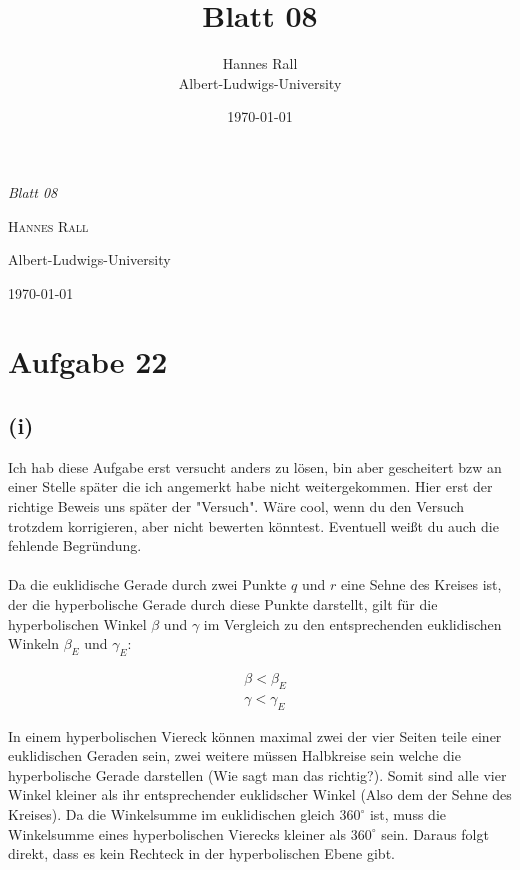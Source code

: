 \documentclass[12pt,a4paper]{article}
\title{Blatt 08}
\author{Hannes Rall \\ Albert-Ludwigs-University}
\date{\today}
\begin{document}
\begin{titlepage}
    \centering
    \vspace*{2cm}
    {\Huge\itshape Blatt 08\par}
    \vspace{2cm}
    {\Large\textsc{Hannes Rall}\par}
    \vfill
    {\large Albert-Ludwigs-University\\}
    \vspace{1cm}
    {\large\today\par}
\end{titlepage}

\newpage
\section*{Aufgabe 22}
\subsection*{(i)}
Ich hab diese Aufgabe erst versucht anders zu lösen, bin aber gescheitert bzw an einer Stelle später die ich angemerkt habe nicht weitergekommen. Hier erst der richtige Beweis uns später der "Versuch". Wäre cool, wenn du den Versuch trotzdem korrigieren, aber nicht bewerten könntest. Eventuell weißt du auch die fehlende Begründung.\\
\\
Da die euklidische Gerade durch zwei Punkte $q$ und $r$ eine Sehne des Kreises ist, der die hyperbolische Gerade durch diese Punkte darstellt, gilt für die hyperbolischen Winkel $\beta$ und $\gamma$ im Vergleich zu den entsprechenden euklidischen Winkeln $\beta_E$ und $\gamma_E$:

\begin{align*}
    & \beta<\beta_E \\ 
    & \gamma < \gamma_E 
\end{align*}

\noindent In einem hyperbolischen Viereck können maximal zwei der vier Seiten teile einer euklidischen Geraden sein, zwei weitere müssen Halbkreise sein welche die hyperbolische Gerade darstellen (Wie sagt man das richtig?). Somit sind alle vier Winkel kleiner als ihr entsprechender euklidscher Winkel (Also dem der Sehne des Kreises). Da die Winkelsumme im euklidischen gleich $360^{\circ}$ ist, muss die Winkelsumme eines hyperbolischen Vierecks kleiner als $360^{\circ}$ sein. Daraus folgt direkt, dass es kein Rechteck in der hyperbolischen Ebene gibt. 
\end{document}
